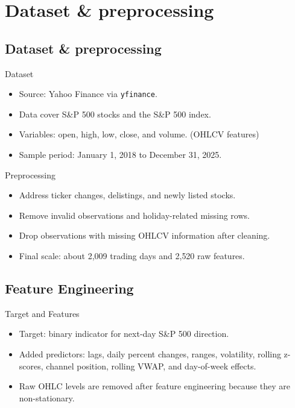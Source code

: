 \documentclass[aspectratio=169,t]{beamer} %
\begin{document}
\section{Dataset \& preprocessing}
\subsection{Dataset \& preprocessing}
\begin{frame}{Dataset}
\begin{itemize}
  \item Source: Yahoo Finance via \texttt{yfinance}.
  \item Data cover S\&P 500 stocks and the S\&P 500 index.
  \item Variables: open, high, low, close, and volume. (OHLCV features)
  \item Sample period: January 1, 2018 to December 31, 2025.
\end{itemize}
\end{frame}

\begin{frame}{Preprocessing}
\begin{itemize}
  \item Address ticker changes, delistings, and newly listed stocks.
  \item Remove invalid observations and holiday-related missing rows.
  \item Drop observations with missing OHLCV information after cleaning.
  \item Final scale: about 2{,}009 trading days and 2{,}520 raw features. 
\end{itemize}
\end{frame}

\subsection{Feature Engineering}
\begin{frame}{Target and Features}
\begin{itemize}
  \item Target: binary indicator for next-day S\&P 500 direction.
  \item Added predictors: lags, daily percent changes, ranges, volatility, rolling z-scores, channel position, rolling VWAP, and day-of-week effects.
  \item Raw OHLC levels are removed after feature engineering because they are non-stationary. 
\end{itemize}
\end{frame}
\end{document}
